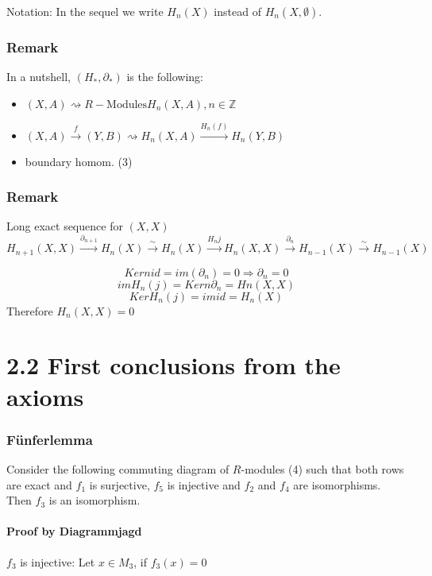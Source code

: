 \documentclass{book}
\newcommand{\Z}{\mathbb{Z}}
\begin{document}
Notation: In the sequel we write $H_n(X)$ instead of $H_n(X,\emptyset)$.

\subsubsection{Remark}
In a nutshell, $(H_*, \partial_*)$ is the following:
\begin{itemize}
	\item $(X,A) \rightsquigarrow R-\text{Modules} H_n(X,A), n \in \Z$
	\item $(X,A) \overset{f}{\rightarrow} (Y,B) \rightsquigarrow H_n(X,A) \overset{H_n(f)}{\rightarrow} H_n(Y,B)$
	\item boundary homom. (3)
\end{itemize}

\subsubsection{Remark}
Long exact sequence for $(X,X)$
\[H_{n+1}(X,X) \overset{\partial_{n+1}}{\longrightarrow} H_n(X) \overset{\sim}{\longrightarrow} H_n(X) \overset{H_nj}{\longrightarrow} H_n(X,X)\overset{\partial_{n}}{\longrightarrow} H_{n-1}(X) \overset{\sim}{\longrightarrow} H_{n-1}(X)  \]

\[Kern id = im(\partial_n) = 0 \Longrightarrow \partial_n = 0 \]
\[im H_n(j) = Kern \partial_n = Hn(X,X)\]
\[Ker H_n(j) = im id = H_n(X) \]
Therefore $H_n(X,X) = 0$

\section{2.2 First conclusions from the axioms}
\subsubsection{Fünferlemma}
Consider the following commuting diagram of $R$-modules
(4)
such that both rows are exact and $f_1$ is surjective, $f_5$ is injective and $f_2$ and $f_4$ are isomorphisms. Then $f_3$ is an isomorphism.

\paragraph{Proof by Diagrammjagd}
$f_3$ is injective:
Let $x \in M_3$, if $f_3(x) = 0$
\end{document}
